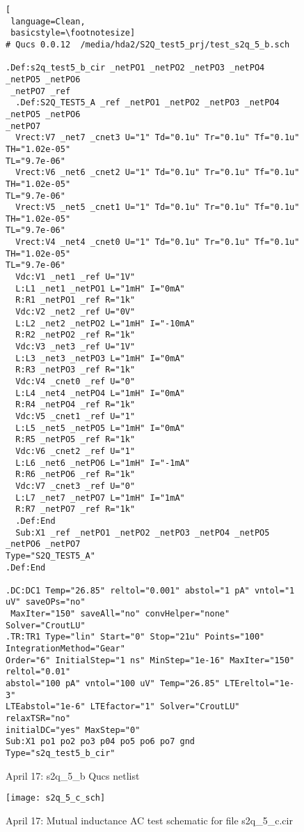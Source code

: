 \begin{figure}
\begin{lstlisting}[
 language=Clean, 
 basicstyle=\footnotesize]
# Qucs 0.0.12  /media/hda2/S2Q_test5_prj/test_s2q_5_b.sch

.Def:s2q_test5_b_cir _netPO1 _netPO2 _netPO3 _netPO4 _netPO5 _netPO6
 _netPO7 _ref
  .Def:S2Q_TEST5_A _ref _netPO1 _netPO2 _netPO3 _netPO4 _netPO5 _netPO6 
_netPO7
  Vrect:V7 _net7 _cnet3 U="1" Td="0.1u" Tr="0.1u" Tf="0.1u" TH="1.02e-05" 
TL="9.7e-06"
  Vrect:V6 _net6 _cnet2 U="1" Td="0.1u" Tr="0.1u" Tf="0.1u" TH="1.02e-05" 
TL="9.7e-06"
  Vrect:V5 _net5 _cnet1 U="1" Td="0.1u" Tr="0.1u" Tf="0.1u" TH="1.02e-05" 
TL="9.7e-06"
  Vrect:V4 _net4 _cnet0 U="1" Td="0.1u" Tr="0.1u" Tf="0.1u" TH="1.02e-05" 
TL="9.7e-06"
  Vdc:V1 _net1 _ref U="1V"
  L:L1 _net1 _netPO1 L="1mH" I="0mA"
  R:R1 _netPO1 _ref R="1k"
  Vdc:V2 _net2 _ref U="0V"
  L:L2 _net2 _netPO2 L="1mH" I="-10mA"
  R:R2 _netPO2 _ref R="1k"
  Vdc:V3 _net3 _ref U="1V"
  L:L3 _net3 _netPO3 L="1mH" I="0mA"
  R:R3 _netPO3 _ref R="1k"
  Vdc:V4 _cnet0 _ref U="0"
  L:L4 _net4 _netPO4 L="1mH" I="0mA"
  R:R4 _netPO4 _ref R="1k"
  Vdc:V5 _cnet1 _ref U="1"
  L:L5 _net5 _netPO5 L="1mH" I="0mA"
  R:R5 _netPO5 _ref R="1k"
  Vdc:V6 _cnet2 _ref U="1"
  L:L6 _net6 _netPO6 L="1mH" I="-1mA"
  R:R6 _netPO6 _ref R="1k"
  Vdc:V7 _cnet3 _ref U="0"
  L:L7 _net7 _netPO7 L="1mH" I="1mA"
  R:R7 _netPO7 _ref R="1k"
  .Def:End
  Sub:X1 _ref _netPO1 _netPO2 _netPO3 _netPO4 _netPO5 _netPO6 _netPO7 
Type="S2Q_TEST5_A"
.Def:End

.DC:DC1 Temp="26.85" reltol="0.001" abstol="1 pA" vntol="1 uV" saveOPs="no"
 MaxIter="150" saveAll="no" convHelper="none" Solver="CroutLU"
.TR:TR1 Type="lin" Start="0" Stop="21u" Points="100" IntegrationMethod="Gear" 
Order="6" InitialStep="1 ns" MinStep="1e-16" MaxIter="150" reltol="0.01" 
abstol="100 pA" vntol="100 uV" Temp="26.85" LTEreltol="1e-3" 
LTEabstol="1e-6" LTEfactor="1" Solver="CroutLU" relaxTSR="no" 
initialDC="yes" MaxStep="0"
Sub:X1 po1 po2 po3 p04 po5 po6 po7 gnd Type="s2q_test5_b_cir"

\end{lstlisting}
 \caption{April 17: s2q\_5\_b Qucs netlist}
  \label{fig:s2q_5_b_qucs}
\end{figure} 

\begin{figure}
  \centering
  \texttt{[image: s2q\_5\_c\_sch]} 
  \caption{April 17: Mutual inductance AC test schematic for file s2q\_5\_c.cir}
  \label{fig:s2q_5_c_sch}
\end{figure} 

